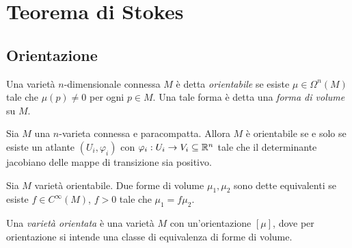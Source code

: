\chapter{Teorema di Stokes}




\section{Orientazione}

\begin{definition}  
	Una varietà $n$-dimensionale connessa $M$ è detta \emph{orientabile} se esiste $\mu\in\Omega^n(M)$ tale che $\mu(p)\not=0$ per ogni $p\in M$. Una tale forma è detta una \emph{forma di volume} su $M$.
\end{definition}

\begin{proposition}
	Sia $M$ una $n$-varieta connessa e paracompatta. Allora $M$ è orientabile se e solo se esiste un atlante $(U_i,\varphi_i)$ con $\varphi_i:U_i\to V_i\subseteq \mathbb R^n$ tale che il determinante jacobiano delle mappe di transizione sia positivo.
\end{proposition}

\begin{definition} 
	Sia $M$ varietà orientabile. Due forme di volume $\mu_1,\mu_2$ sono dette equivalenti se esiste $f\in C^\infty(M)$, $f>0$ tale che $\mu_1= f \mu_2$.
	
	Una \emph{varietà orientata} è una varietà $M$ con un'orientazione $[\mu]$, dove per orientazione si intende una classe di equivalenza di forme di volume.
\end{definition}

